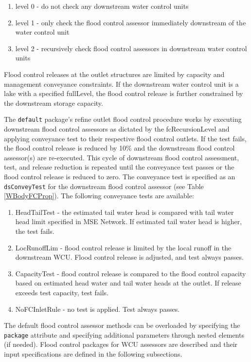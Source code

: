 \begin{enumerate}
  \begin{enumerate}

     \item level 0 \-- do not check any downstream water control units
     \item level 1 \-- only check the flood control assessor
      immediately downstream of the water control unit
     \item level 2 \-- recursively check flood control assessors in
      downstream water control units
  \end{enumerate}
\end{enumerate}

Flood control releases at the outlet structures are limited by
capacity and management conveyance constraints.  If the downstream
water control unit is a lake with a specified fullLevel, the flood
control release is further constrained by the downstream storage
capacity.

The {\tt default} package's refine outlet flood control procedure
works by executing downstream flood control assessors as dictated by
the fcRecursionLevel and applying conveyance test to their respective
flood control outlets.  If the test fails, the flood control release
is reduced by 10\% and the downstream flood control assessor(s) are
re-executed.  This cycle of downstream flood control assessment, test,
and release reduction is repeated until the conveyance test passes or
the flood control release is reduced to zero.  The conveyance test is
specified as an {\tt dsConveyTest} for the downstream flood control
assessor (see Table \ref{WBodyFCProp}).  The following conveyance
tests are available:

\begin{enumerate}
 \item HeadTailTest \-- the estimated tail water head is compared with
   tail water head limit specified in MSE Network.  If estimated tail
   water head is higher, the test fails.

 \item LocRunoffLim \-- flood control release is limited by the local
   runoff in the downstream WCU.  Flood control release is adjusted,
   and test always passes.

 \item CapacityTest \-- flood control release is compared to the flood
   control capacity based on estimated head water and tail water heads
   at the outlet.  If release exceeds test capacity, test fails.

 \item NoFCInletRule \-- no test is applied.  Test always passes.

\end{enumerate}

The default flood control assessor methods can be overloaded by
specifying the {\tt package} attribute and specifying additional
parameters through nested elements (if needed).  Flood control
packages for WCU assessors are described and their input
specifications are defined in the following subsections.

